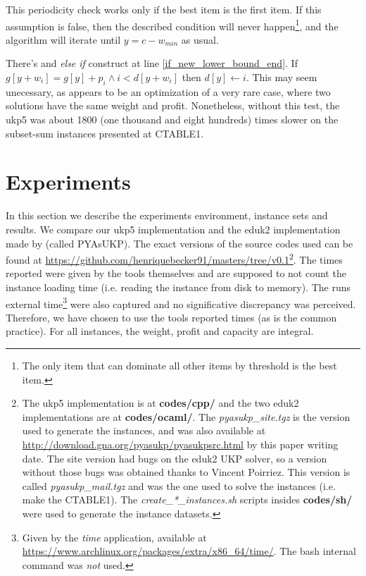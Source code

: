 \documentclass[runningheads,a4paper]{llncs}
\begin{document}

This periodicity check works only if the best item is the first item. If this assumption is false, then the described condition will never happen\footnote{The only item that can dominate all other items by threshold is the best item.}, and the algorithm will iterate until \(y = c - w_{min}\) as usual.

There's and \emph{else if} construct at line \ref{if_new_lower_bound_end}. If \(g[y + w_i] = g[y] + p_i \land i < d[y + w_i]\) then \(d[y] \gets i\). This may seem unecessary, as appears to be an optimization of a very rare case, where two solutions have the same weight and profit. Nonetheless, without this test, the ukp5 was about 1800 (one thousand and eight hundreds) times slower on the subset-sum instances presented at CTABLE1.

\section{Experiments}
In this section we describe the experiments environment, instance sets and results. We compare our ukp5 implementation and the eduk2 implementation made by \cite{CPYA} (called PYAsUKP). The exact versions of the source codes used can be found at \url{https://github.com/henriquebecker91/masters/tree/v0.1}\footnote{The ukp5 implementation is at \textbf{codes/cpp/} and the two eduk2 implementations are at \textbf{codes/ocaml/}. The \emph{pyasukp\_site.tgz} is the version used to generate the instances, and was also available at \url{http://download.gna.org/pyasukp/pyasukpsrc.html} by this paper writing date. The site version had bugs on the eduk2 UKP solver, so a version without those bugs was obtained thanks to Vincent Poirriez. This version is called \emph{pyasukp\_mail.tgz} and was the one used to solve the instances (i.e. make the CTABLE1). The \emph{create\_*\_instances.sh} scripts insides \textbf{codes/sh/} were used to generate the instance datasets.}. The times reported were given by the tools themselves and are supposed to not count the instance loading time (i.e. reading the instance from disk to memory). The runs external time\footnote{Given by the \textit{time} application, available at \url{https://www.archlinux.org/packages/extra/x86_64/time/}. The bash internal command was \emph{not} used.} were also captured and no significative discrepancy was perceived. Therefore, we have chosen to use the tools reported times (as is the common practice). For all instances, the weight, profit and capacity are integral.
\end{document}
